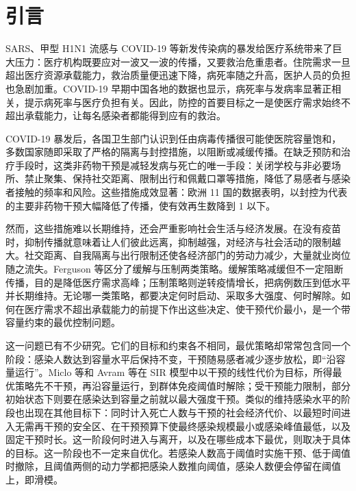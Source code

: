 \section{引言}
\label{sec:introduction}
SARS、甲型 H1N1 流感与 COVID-19 等新发传染病的暴发给医疗系统带来了巨大压力：医疗机构既要应对一波又一波的传播，又要救治危重患者\cite{Zhou2024SPCI}。住院需求一旦超出医疗资源承载能力，救治质量便迅速下降，病死率随之升高，医护人员的负担也急剧加重\cite{Zhou2024SPCI,Balderrama2024}。COVID-19 早期中国各地的数据也显示，病死率与发病率显著正相关，提示病死率与医疗负担有关\cite{Ji2020Mortality}。因此，防控的首要目标之一是使医疗需求始终不超出承载能力，让每名感染者都能得到应有的救治\cite{Miclo2022ICU}。

COVID-19 暴发后，各国卫生部门认识到任由病毒传播很可能使医院容量饱和，多数国家随即采取了严格的隔离与封控措施，以阻断或减缓传播\cite{Charpentier2020}。在缺乏预防和治疗手段时，这类非药物干预是减轻发病与死亡的唯一手段：关闭学校与非必要场所、禁止聚集、保持社交距离、限制出行和佩戴口罩等措施，降低了易感者与感染者接触的频率和风险\cite{Duque2020}。这些措施成效显著：欧洲 11 国的数据表明，以封控为代表的主要非药物干预大幅降低了传播，使有效再生数降到 1 以下\cite{Flaxman2020NPI}。

然而，这些措施难以长期维持，还会严重影响社会生活与经济发展。在没有疫苗时，抑制传播就意味着让人们彼此远离，抑制越强，对经济与社会活动的限制越大\cite{Miclo2022ICU}。社交距离、自我隔离与出行限制还使各经济部门的劳动力减少，大量就业岗位随之流失\cite{Nicola2020Socioeconomic}。Ferguson 等\cite{Ferguson2020Report9}区分了缓解与压制两类策略。缓解策略减缓但不一定阻断传播，目的是降低医疗需求高峰；压制策略则逆转疫情增长，把病例数压到低水平并长期维持。无论哪一类策略，都要决定何时启动、采取多大强度、何时解除。如何在医疗需求不超出承载能力的前提下作出这些决定、使干预代价最小，是一个带容量约束的最优控制问题。

这一问题已有不少研究。它们的目标和约束各不相同，最优策略却常常包含同一个阶段：感染人数达到容量水平后保持不变，干预随易感者减少逐步放松，即“沿容量运行”。Miclo 等\cite{Miclo2022ICU}和 Avram 等\cite{Avram2022}在 SIR 模型中以干预的线性代价为目标，所得最优策略先不干预，再沿容量运行，到群体免疫阈值时解除；受干预能力限制，部分初始状态下则要在感染达到容量之前就以最大强度干预\cite{Avram2022}。类似的维持感染水平的阶段也出现在其他目标下：同时计入死亡人数与干预的社会经济代价\cite{Kantner2020Beyond}、以最短时间进入无需再干预的安全区\cite{Angulo2021}、在干预预算下使最终感染规模最小\cite{Balderrama2024}或感染峰值最低\cite{Molina2022Peak}，以及固定干预时长\cite{Morris2021Control}。这一阶段何时进入与离开，以及在哪些成本下最优，则取决于具体的目标\cite{Angulo2021,Freddi2022StateCost,FreddiGoreac2024Infinite}。这一阶段也不一定来自优化。若感染人数高于阈值时实施干预、低于阈值时撤除，且阈值两侧的动力学都把感染人数推向阈值，感染人数便会停留在阈值上，即滑模\cite{Xiao2012Sliding}。

